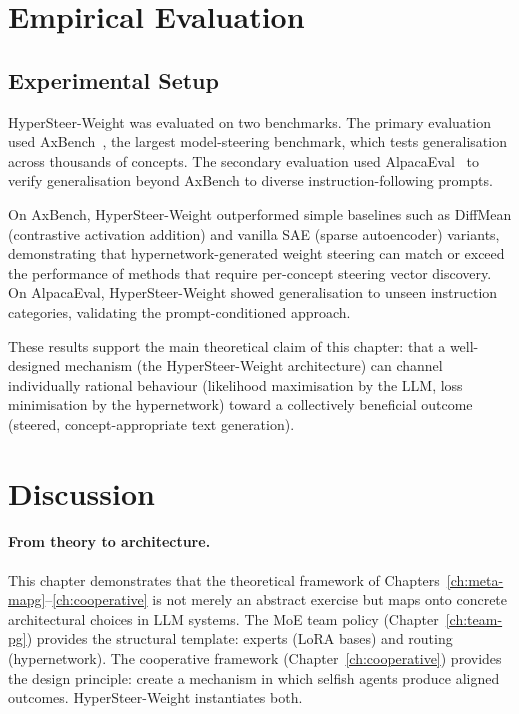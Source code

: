 \section{Empirical Evaluation}
\label{sec:empirical}

\subsection{Experimental Setup}
\label{subsec:exp-setup}

HyperSteer-Weight was evaluated on two benchmarks. The primary evaluation used AxBench~\cite{wu2025}, the largest model-steering benchmark, which tests generalisation across thousands of concepts. The secondary evaluation used AlpacaEval~\cite{alpacaeval2024} to verify generalisation beyond AxBench to diverse instruction-following prompts.

On AxBench, HyperSteer-Weight outperformed simple baselines such as DiffMean (contrastive activation addition) and vanilla SAE (sparse autoencoder) variants, demonstrating that hypernetwork-generated weight steering can match or exceed the performance of methods that require per-concept steering vector discovery. On AlpacaEval, HyperSteer-Weight showed generalisation to unseen instruction categories, validating the prompt-conditioned approach.

These results support the main theoretical claim of this chapter: that a well-designed mechanism (the HyperSteer-Weight architecture) can channel individually rational behaviour (likelihood maximisation by the LLM, loss minimisation by the hypernetwork) toward a collectively beneficial outcome (steered, concept-appropriate text generation).

\section{Discussion}
\label{sec:ch8-discussion}

\paragraph{From theory to architecture.} This chapter demonstrates that the theoretical framework of Chapters~\ref{ch:meta-mapg}--\ref{ch:cooperative} is not merely an abstract exercise but maps onto concrete architectural choices in LLM systems. The MoE team policy (Chapter~\ref{ch:team-pg}) provides the structural template: experts (LoRA bases) and routing (hypernetwork). The cooperative framework (Chapter~\ref{ch:cooperative}) provides the design principle: create a mechanism in which selfish agents produce aligned outcomes. HyperSteer-Weight instantiates both.

